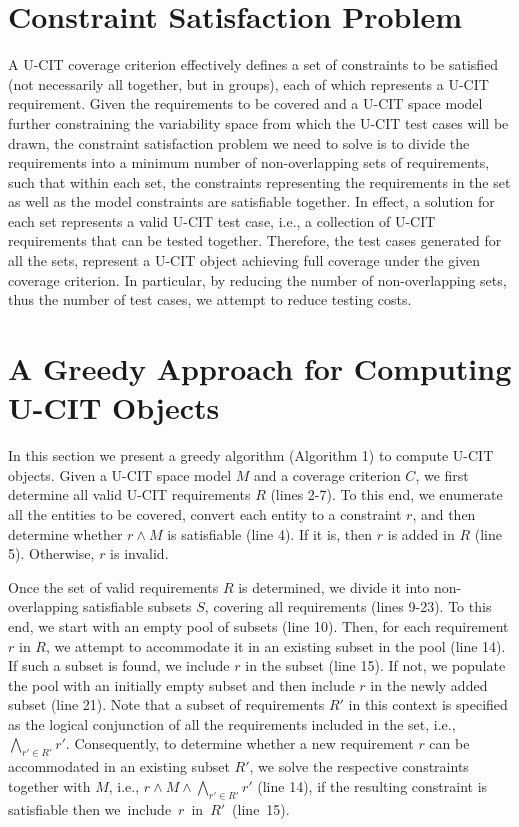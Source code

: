 \documentclass[EPiC]{easychair}
\begin{document}
\section{Constraint Satisfaction Problem}
\label{problem}

A U-CIT coverage criterion effectively defines a set of constraints to be satisfied (not necessarily all together, but in groups), each of which represents a U-CIT requirement. Given the requirements to be covered and a U-CIT space model further constraining the variability space from which the U-CIT test cases will be drawn, the constraint satisfaction problem we need to solve is to divide the requirements into a minimum number of non-overlapping sets of requirements, such that within each set, the constraints representing the requirements in the set as well as the model constraints are satisfiable together. In effect, a solution for each set represents a valid U-CIT test case, i.e., a collection of U-CIT requirements that can be tested together. Therefore, the test cases generated for all the sets, represent a U-CIT object achieving full coverage under the given coverage criterion. In particular, by reducing the number of non-overlapping sets, thus the number of test cases, we attempt to reduce testing costs.

\section{A Greedy Approach for Computing U-CIT Objects} 
\label{Approach}

In this section we present a greedy algorithm (Algorithm 1) to compute U-CIT objects. Given a U-CIT space model $M$ and a coverage criterion $C$, we first determine all valid U-CIT requirements $R$ (lines 2-7). To this end, we enumerate all the entities to be covered, convert each entity to a constraint $r$, and then determine whether $r \wedge M$ is satisfiable (line 4). If it is, then $r$ is added in $R$ (line 5). Otherwise, $r$ is invalid. 

Once the set of valid requirements $R$ is determined, we divide it into non-overlapping satisfiable subsets $S$, covering all requirements (lines 9-23). To this end, we start with an empty pool of subsets (line 10). Then, for each requirement $r$ in $R$, we attempt to accommodate it in an existing subset in the pool (line 14). If such a subset is found, we include $r$ in the subset (line 15). If not, we populate the pool with an initially empty subset and then include $r$ in the newly added subset (line 21). Note that a subset of requirements $R'$ in this context is specified as the logical conjunction of all the requirements included in the set, i.e., $\bigwedge_{r' \in R'}r'$. Consequently, to determine whether a new requirement $r$ can be accommodated in an existing subset $R'$, we solve the respective constraints together with $M$, i.e.,  $r \wedge M \wedge \bigwedge_{r' \in R'}r'$ (line 14), if the resulting constraint is satisfiable then we~include~$r$~in~$R'$~(line~15). 
\end{document}
